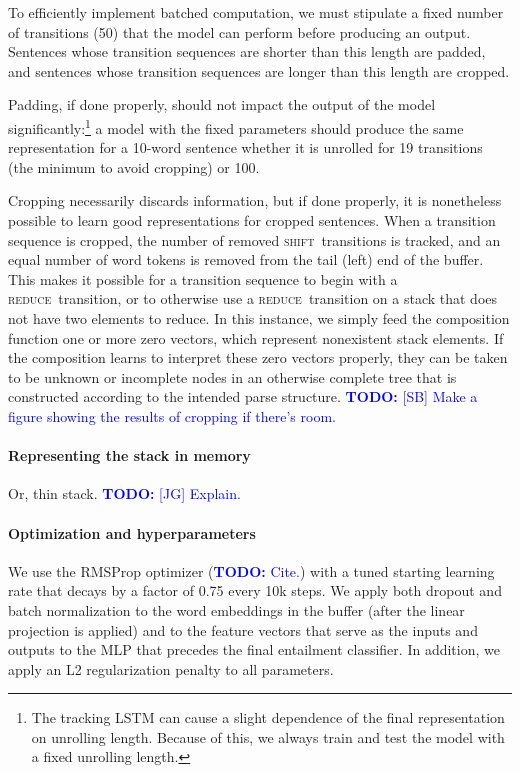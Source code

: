 \documentclass[11pt,letterpaper]{article}
\newcommand\todo[1]{\textcolor{blue}{\textbf{TODO:} #1}}
\newcommand{\shift}{\textsc{shift}}
\newcommand{\reduce}{\textsc{reduce}}
\begin{document}
To efficiently implement batched computation, we must stipulate a fixed number of transitions (50) that the model can perform before producing an output. Sentences whose transition sequences are shorter than this length are padded, and sentences whose transition sequences are longer than this length are cropped. 

Padding, if done properly, should not impact the output of the model significantly:\footnote{The tracking LSTM can cause a slight dependence of the final representation on unrolling length. Because of this, we always train and test the model with a fixed unrolling length.} a model with the fixed parameters should produce the same representation for a 10-word sentence whether it is unrolled for 19 transitions (the minimum to avoid cropping) or 100.

Cropping necessarily discards information, but if done properly, it is nonetheless possible to learn good representations for cropped sentences. When a transition sequence is cropped, the number of removed \shift~transitions is tracked, and an equal number of word tokens is removed from the tail (left) end of the buffer. This makes it possible for a transition sequence to begin with a \reduce~transition, or to otherwise use a \reduce~transition on a stack that does not have two elements to reduce. In this instance, we simply feed the composition function one or more zero vectors, which represent nonexistent stack elements. If the composition learns to interpret these zero vectors properly, they can be taken to be unknown or incomplete nodes in an otherwise complete tree that is constructed according to the intended parse structure. \todo{[SB] Make a figure showing the results of cropping if there's room.}

\paragraph{Representing the stack in memory} Or, thin stack. 
\todo{[JG] Explain.}

\vspace{8em}

\paragraph{Optimization and hyperparameters}

We use the RMSProp optimizer (\todo{Cite.}) with a tuned starting learning rate that decays by a factor of 0.75 every 10k steps. We apply both dropout \cite{srivastava2014dropout} and batch normalization \cite{2015SIoffeCSzegedy} to the word embeddings in the buffer (after the linear projection is applied) and to the feature vectors that serve as the inputs and outputs to the MLP that precedes the final entailment classifier. In addition, we apply an L2 regularization penalty to all parameters.
\end{document}
